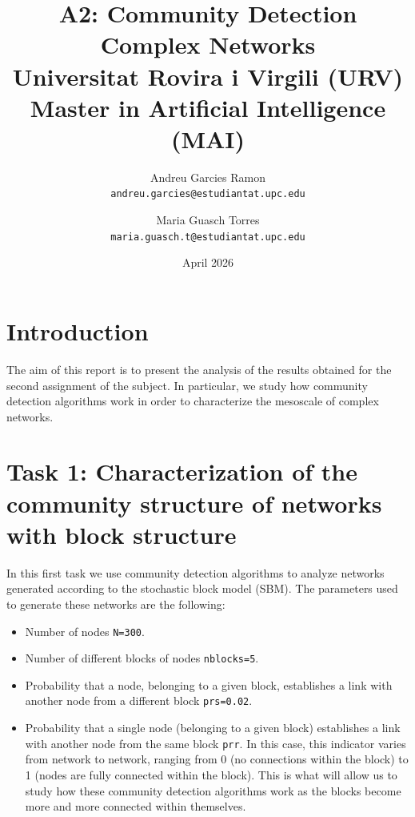 \documentclass{article}
\title{
    \textbf{A2: Community Detection}\\
    \large Complex Networks\\
    \small Universitat Rovira i Virgili (URV)\\
    \small Master in Artificial Intelligence (MAI)
}
\author{
    Andreu Garcies Ramon\\
    \texttt{andreu.garcies@estudiantat.upc.edu}
    \and
    Maria Guasch Torres\\
    \texttt{maria.guasch.t@estudiantat.upc.edu}
}
\date{April 2026}
\begin{document}
\maketitle

\section{Introduction}

The aim of this report is to present the analysis of the results obtained for the second assignment of the subject. In particular, we study how community detection algorithms work in order to characterize the mesoscale of complex networks.

\section{Task 1: Characterization of the community structure of networks with block structure}\label{sec:part1}

In this first task we use community detection algorithms to analyze networks generated according to the stochastic block model (SBM). The parameters used to generate these networks are the following:

\begin{itemize}
    \item Number of nodes \texttt{N=300}.
    \item Number of different blocks of nodes \texttt{nblocks=5}.
    \item  Probability that a node, belonging to a given block, establishes a link with another node from a different block \texttt{prs=0.02}.
    \item Probability that a single node (belonging to a given block) establishes a link with another node from the same block \texttt{prr}. In this case, this indicator varies from network to network, ranging from 0 (no connections within the block) to 1 (nodes are fully connected within the block). This is what will allow us to study how these community detection algorithms work as the blocks become more and more connected within themselves.
\end{itemize}
\end{document}
